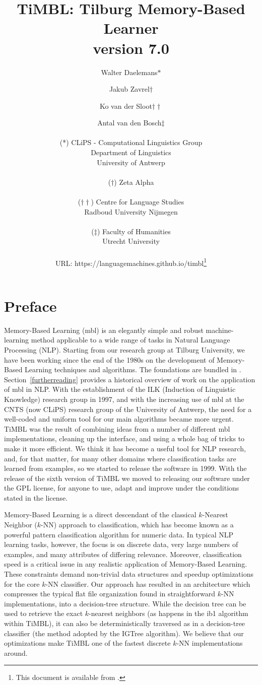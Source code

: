 \documentclass{book}
\author{Walter Daelemans$*$ \and Jakub Zavrel$\dagger$ \and Ko van der Sloot$\dagger\dagger$\\ \and
	Antal van den Bosch$\ddagger$\\ \ \\
	(*) CLiPS - Computational Linguistics Group\\
        Department of Linguistics \\
	University of Antwerp\\ \\
	($\dagger$) Zeta Alpha\\ \\
        ($\dagger\dagger$) Centre for Language Studies \\
        Radboud University Nijmegen \\ \\
        ($\ddagger$) Faculty of Humanities \\
        Utrecht University \\ \\
        URL: https://languagemachines.github.io/timbl\thanks{This document is available from
	\timblmanualurl.}}
\title{{\huge TiMBL: Tilburg Memory-Based Learner} \\ \vspace*{0.5cm}
{\bf version 7.0} \\ \vspace*{0.5cm}{\huge Reference Guide}}
\begin{document}

\maketitle

\tableofcontents

\chapter*{Preface}

Memory-Based Learning ({\sc mbl}) is an elegantly simple and robust
machine-learning method applicable to a wide range of tasks in Natural
Language Processing (NLP).  Starting from our research group at
Tilburg University, we have been working since the end of the 1980s on
the development of Memory-Based Learning techniques and
algorithms. The foundations are bundled in
. Section~\ref{furtherreading} provides a
historical overview of work on the application of {\sc mbl} in
NLP. With the establishment of the ILK (Induction of Linguistic
Knowledge) research group in 1997, and with the increasing use of {\sc
  mbl} at the CNTS (now CLiPS) research group of the University of
Antwerp, the need for a well-coded and uniform tool for our main
algorithms became more urgent. TiMBL was the result of combining ideas
from a number of different {\sc mbl} implementations, cleaning up the
interface, and using a whole bag of tricks to make it more
efficient. We think it has become a useful tool for NLP research, and,
for that matter, for many other domains where classification tasks are
learned from examples, so we started to release the software in
1999. With the release of the sixth version of TiMBL we moved to
releasing our software under the GPL license, for anyone to use, adapt
and improve under the conditions stated in the license.

Memory-Based Learning is a direct descendant of the classical
$k$-Nearest Neighbor ($k$-NN) approach to classification, which has
become known as a powerful pattern classification algorithm for
numeric data. In typical NLP learning tasks, however, the focus is on
discrete data, very large numbers of examples, and many attributes of
differing relevance. Moreover, classification speed is a critical
issue in any realistic application of Memory-Based Learning. These
constraints demand non-trivial data structures and speedup
optimizations for the core $k$-NN classifier. Our approach has
resulted in an architecture which compresses the typical flat file
organization found in straightforward $k$-NN implementations, into a
decision-tree structure. While the decision tree can be used to
retrieve the exact $k$-nearest neighbors (as happens in the {\sc ib1}
algorithm within TiMBL), it can also be deterministically traversed as
in a decision-tree classifier (the method adopted by the {\sc IGTree}
algorithm). We believe that our optimizations make TiMBL one of the
fastest discrete $k$-NN implementations around.
\end{document}
